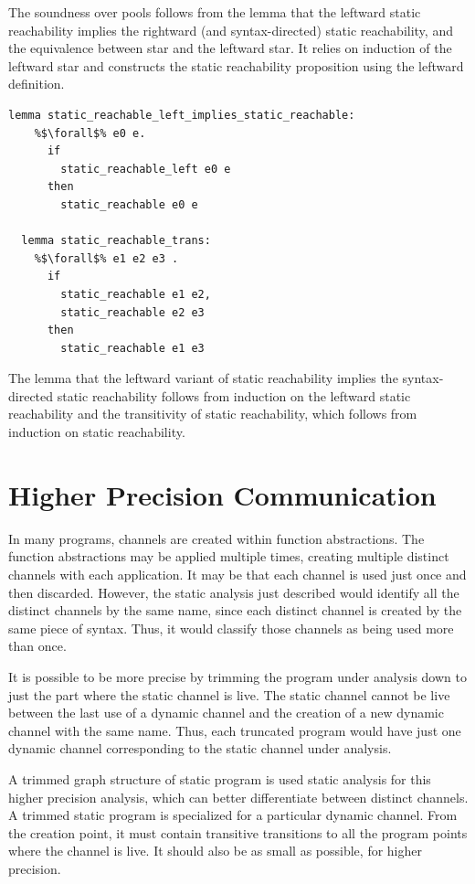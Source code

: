 \documentclass{article}
\begin{document}
The soundness over pools follows from the lemma that the leftward
static reachability implies the rightward (and syntax-directed) static reachability,
and the equivalence between star and the leftward star.  It relies on induction of the
leftward star and constructs the static reachability
proposition using the leftward definition.  

\begin{lstlisting}[language=logic, escapechar=\%]
  lemma static_reachable_left_implies_static_reachable:
    %$\forall$% e0 e. 
      if
        static_reachable_left e0 e
      then
        static_reachable e0 e

  lemma static_reachable_trans:
    %$\forall$% e1 e2 e3 .
      if 
        static_reachable e1 e2,
        static_reachable e2 e3
      then
        static_reachable e1 e3
  \end{lstlisting}


The lemma that the leftward variant of static reachability implies the syntax-directed static
reachability follows from induction on the leftward static reachability and the
transitivity of static
reachability, which follows from induction on static reachability.

\section{Higher Precision Communication}
In many programs, channels are created within function abstractions.  The function abstractions
may be applied multiple times, creating multiple distinct channels with each application.
It may be that each channel is used just once and then discarded.  However, the static
analysis just described would identify all the distinct channels by the same name, since each
distinct channel is created by the same piece of syntax. Thus, it would classify those channels
as being used more than once.

It is possible to be more precise by trimming the program under analysis down to just the part
where the static channel is live. The static channel cannot be live between the last use of a
dynamic channel and the creation of a new dynamic channel with the same name.  Thus, each
truncated program would have just one dynamic channel corresponding to the static channel under
analysis. 

A trimmed graph structure of static program is used static analysis for this higher precision
analysis, which can better differentiate between distinct channels. 
A trimmed static program is specialized for a particular dynamic channel.  From the creation
point, it must contain transitive transitions to all the program points where the
channel is live. It should also be as small as possible, for higher precision.
\end{document}

